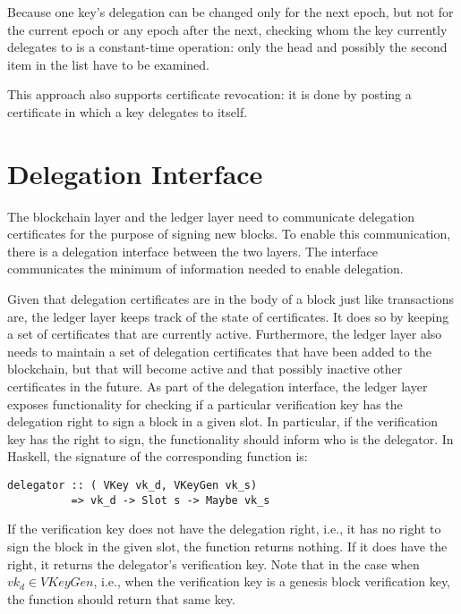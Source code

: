 \documentclass[11pt,a4paper]{article}
\begin{document}
Because one key's delegation can be changed only for the next epoch, but
not for the current epoch or any epoch after the next, checking whom the key
currently delegates to is a constant-time operation: only the head and
possibly the second item in the list have to be examined.

This approach also supports certificate revocation: it is done by posting a
certificate in which a key delegates to itself.


\section{Delegation Interface}
\label{sec:del-interface}

The blockchain layer and the ledger layer need to communicate delegation
certificates for the purpose of signing new blocks.
%
To enable this communication, there is a delegation interface between the two
layers.
%
The interface communicates the minimum of information needed to enable
delegation.


Given that delegation certificates are in the body of a block just like
transactions are, the ledger layer keeps track of the state of certificates.
%
It does so by keeping a set of certificates that are currently active.
%
Furthermore, the ledger layer also needs to maintain a set of delegation
certificates that have been added to the blockchain, but that will become
active and that possibly inactive other certificates in the future.
%
As part of the delegation interface, the ledger layer exposes functionality
for checking if a particular verification key has the delegation right to sign
a block in a given slot.
%
In particular, if the verification key has the right to sign, the
functionality should inform who is the delegator.
%
In Haskell, the signature of the corresponding function is:
%
\begin{lstlisting}
delegator :: ( VKey vk_d, VKeyGen vk_s)
          => vk_d -> Slot s -> Maybe vk_s
\end{lstlisting}

If the verification key does not have the delegation right, i.e., it has no
right to sign the block in the given slot, the function returns nothing.
%
If it does have the right, it returns the delegator's verification key.
%
Note that in the case when $vk_d \in VKeyGen$, i.e., when the verification key
is a genesis block verification key, the function should return that same key.
\end{document}
